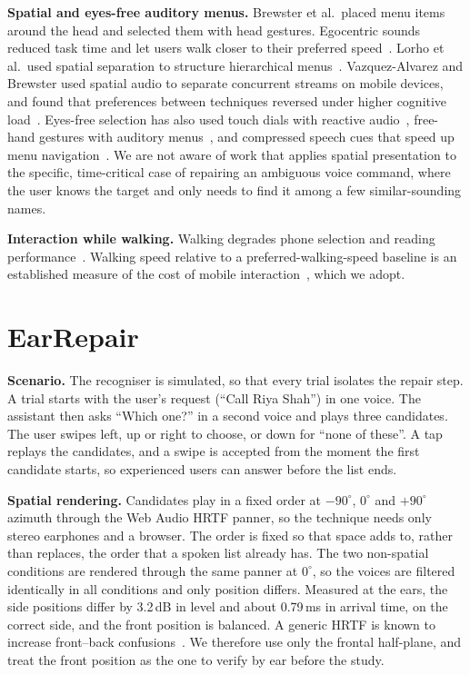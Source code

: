 \documentclass[conference,letterpaper]{IEEEtran}
\begin{document}
\textbf{Spatial and eyes-free auditory menus.} Brewster et al.\ placed menu items around the head and
selected them with head gestures. Egocentric sounds reduced task time and let users walk closer to
their preferred speed~\cite{brewster2003multimodal}. Lorho et al.\ used spatial separation to structure
hierarchical menus~\cite{lorho2002structured}. Vazquez-Alvarez and Brewster used spatial audio to
separate concurrent streams on mobile devices, and found that preferences between techniques reversed
under higher cognitive load~\cite{vazquez2010designing,vazquez2011eyesfree}. Eyes-free selection has
also used touch dials with reactive audio~\cite{zhao2007earpod}, free-hand gestures with auditory
menus~\cite{kajastila2013eyesfree}, and compressed speech cues that speed up menu
navigation~\cite{walker2013spearcons}. We are not aware of work that applies spatial presentation to
the specific, time-critical case of repairing an ambiguous voice command, where the user knows the
target and only needs to find it among a few similar-sounding names.

\textbf{Interaction while walking.} Walking degrades phone selection and reading
performance~\cite{schildbach2010walking}. Walking speed relative to a preferred-walking-speed baseline is
an established measure of the cost of mobile interaction~\cite{ng2014comparing}, which we adopt.

\section{EarRepair}
\textbf{Scenario.} The recogniser is simulated, so that every trial isolates the repair step. A trial
starts with the user's request (``Call Riya Shah'') in one voice. The assistant then asks ``Which one?''
in a second voice and plays three candidates. The user swipes left, up or right to choose, or down for
``none of these''. A tap replays the candidates, and a swipe is accepted from the moment the first
candidate starts, so experienced users can answer before the list ends.

\textbf{Spatial rendering.} Candidates play in a fixed order at $-90^{\circ}$, $0^{\circ}$ and
$+90^{\circ}$ azimuth through the Web Audio HRTF panner, so the technique needs only stereo earphones and
a browser. The order is fixed so that space adds to, rather than replaces, the order that a spoken list
already has. The two non-spatial conditions are rendered through the same panner at $0^{\circ}$, so the
voices are filtered identically in all conditions and only position differs. Measured at the ears, the
side positions differ by 3.2\,dB in level and about 0.79\,ms in arrival time, on the correct side, and
the front position is balanced. A generic HRTF is known to increase front--back
confusions~\cite{wenzel1993localization}. We therefore use only the frontal half-plane, and treat the
front position as the one to verify by ear before the study.
\end{document}
